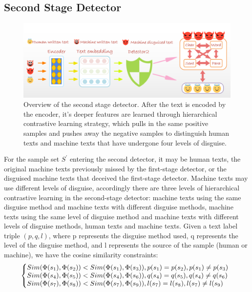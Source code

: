 \documentclass[11pt]{article}
\begin{document}
	\subsection{Second Stage Detector}
	\label{sec:second_stage}
	\begin{figure}
    \centering
    \includegraphics[width=1.0\linewidth]{pics/second-detector.png}
    \caption{Overview of the second stage detector. After the text is encoded by the encoder, it's deeper features are learned through hierarchical contrastive learning strategy, which pulls in the same positive samples and pushes away the negative samples to distinguish human texts and machine texts that have undergone four levels of disguise.}
\label{fig:second-detector}
\end{figure}
	For the sample set $S^\prime$ entering the second detector, it may be human texts, the original machine texts previously missed by the first-stage detector, or the disguised machine texts that deceived the first-stage detector. Machine texts may use different levels of disguise, accordingly there are three levels of hierarchical contrastive learning in the second-stage detector: machine texts using the same disguise method and machine texts with different disguise methods, machine texts using the same level of disguise method and machine texts with different levels of disguise methods, human texts and machine texts. Given a text label triple $(p, q, l)$, where p represents the disguise method used, q represents the level of the disguise method, and l represents the source of the sample (human or machine), we have the cosine similarity constraints:
	\begin{equation}
    \label{ineq:sim_equal}
    \left\{
    \begin{array}{@{\extracolsep{\fill}}lllll}
      Sim(\Phi(s_1),\Phi(s_2))<Sim(\Phi(s_1),\Phi(s_3)),p(s_1)=p(s_2),p(s_1)\neq p(s_3)\\
      Sim(\Phi(s_4),\Phi(s_5))<Sim(\Phi(s_4),\Phi(s_6)),q(s_4)=q(s_5),q(s_4)\neq q(s_6)\\
      Sim(\Phi(s_7),\Phi(s_8))<Sim(\Phi(s_7),\Phi(s_9)),l(s_7)=l(s_8),l(s_7)\neq l(s_9)\\
    \end{array}
    \right.
    \end{equation}
\end{document}
